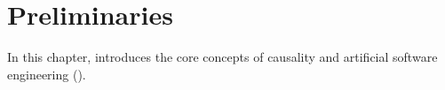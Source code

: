 \chapter{Preliminaries}
\label{ch:preliminaries}

In this chapter,  introduces the core concepts of causality and artificial software engineering (\asofte). 









